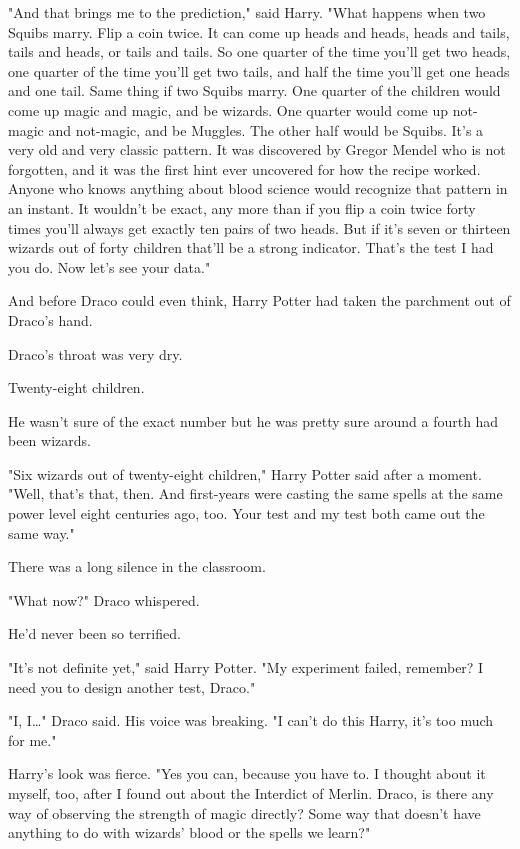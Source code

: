 "And that brings me to the prediction," said Harry. "What happens when two 
Squibs marry. Flip a coin twice. It can come up heads and heads, heads and 
tails, tails and heads, or tails and tails. So one quarter of the time you'll 
get two heads, one quarter of the time you'll get two tails, and half the time 
you'll get one heads and one tail. Same thing if two Squibs marry. One quarter 
of the children would come up magic and magic, and be wizards. One quarter 
would come up not-magic and not-magic, and be Muggles. The other half would be 
Squibs. It's a very old and very classic pattern. It was discovered by Gregor 
Mendel who is not forgotten, and it was the first hint ever uncovered for how 
the recipe worked. Anyone who knows anything about blood science would 
recognize that pattern in an instant. It wouldn't be exact, any more than if 
you flip a coin twice forty times you'll always get exactly ten pairs of two 
heads. But if it's seven or thirteen wizards out of forty children that'll be a 
strong indicator. That's the test I had you do. Now let's see your data."

And before Draco could even think, Harry Potter had taken the parchment out of 
Draco's hand.

Draco's throat was very dry.

Twenty-eight children.

He wasn't sure of the exact number but he was pretty sure around a fourth had 
been wizards.

"Six wizards out of twenty-eight children," Harry Potter said after a moment. 
"Well, that's that, then. And first-years were casting the same spells at the 
same power level eight centuries ago, too. Your test and my test both came out 
the same way."

There was a long silence in the classroom.

"What now?" Draco whispered.

He'd never been so terrified.

"It's not definite yet," said Harry Potter. "My experiment failed, remember? I 
need you to design another test, Draco."

"I, I{\ldots}" Draco said. His voice was breaking. "I can't do this Harry, it's 
too much for me."

Harry's look was fierce. "Yes you can, because you have to. I thought about it 
myself, too, after I found out about the Interdict of Merlin. Draco, is there 
any way of observing the strength of magic directly? Some way that doesn't have 
anything to do with wizards' blood or the spells we learn?"

